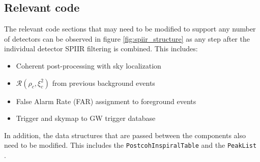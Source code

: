 \documentclass{article}
\begin{document}
\subsection{Relevant code} \label{sec:design_process:code}

The relevant code sections that may need to be modified to support any number of detectors can be observed in figure \ref{fig:spiir_structure} as any step after the individual detector SPIIR filtering is combined.
This includes:
\begin{itemize}
    \item Coherent post-processing with sky localization\\ \cite[\texttt{gstlal-spiir/gst/cuda/postcoh/}]{spiir}
    \item \(\mathcal{R}(\rho_c,\xi^2_c)\) from previous background events\\ \cite[\texttt{gstlal-spiir/gst/cuda/cohfar/cohfar\_accumbackground.c}]{spiir}
    \item False Alarm Rate (FAR) assignment to foreground events\\ \cite[\texttt{gstlal-spiir/gst/cuda/cohfar/cohfar\_assignfar.c}]{spiir}
    \item Trigger and skymap to GW trigger database\\ \cite[\texttt{gstlal-spiir/python/pipemodules/postcoh\_finalsink.py}]{spiir}
\end{itemize}

In addition, the data structures that are passed between the components also need to be modified.
This includes the \texttt{PostcohInspiralTable} \cite[\texttt{gstlal-spiir/python/pipemodules/postcohtable/}]{spiir} and the \texttt{PeakList} \cite[\texttt{gstlal-spiir/gst/cuda/postcoh/postcoh.h}]{spiir}.
\end{document}
